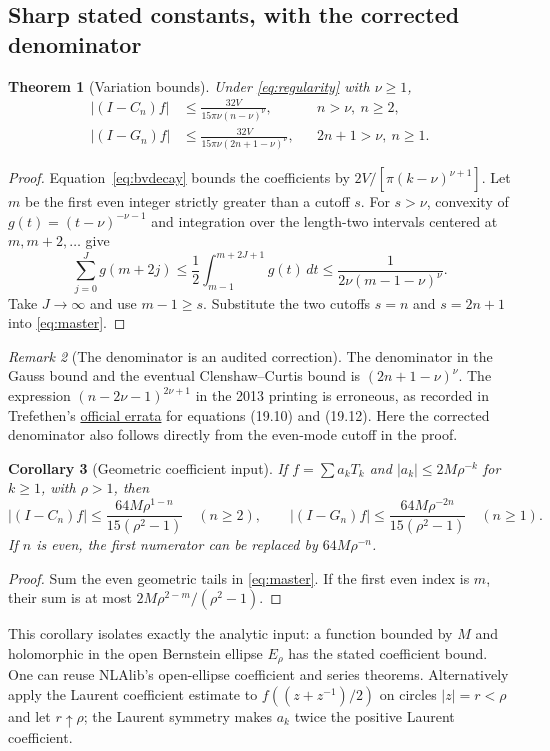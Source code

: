 \documentclass[11pt]{article}
\newtheorem{theorem}{Theorem}[section]
\newtheorem{corollary}[theorem]{Corollary}
\theoremstyle{remark}\newtheorem{remark}[theorem]{Remark}
\begin{document}
\subsection{Sharp stated constants, with the corrected denominator}
\begin{theorem}[Variation bounds]\label{thm:quad-bv}
Under \eqref{eq:regularity} with $\nu\ge1$,
\begin{align}
 |(I-C_n)f|&\le\frac{32V}{15\pi\nu(n-\nu)^\nu},
                  &&n>\nu,\ n\ge2,\label{eq:cc-bv}\\
 |(I-G_n)f|&\le\frac{32V}{15\pi\nu(2n+1-\nu)^\nu},
                  &&2n+1>\nu,\ n\ge1.\label{eq:g-bv}
\end{align}
\end{theorem}
\begin{proof}
Equation~\eqref{eq:bvdecay} bounds the coefficients by
$2V/[\pi(k-\nu)^{\nu+1}]$. Let $m$ be the first even integer strictly
greater than a cutoff $s$. For $s>\nu$, convexity of
$g(t)=(t-\nu)^{-\nu-1}$ and integration over the length-two intervals
centered at $m,m+2,\ldots$ give
\[
 \sum_{j=0}^J g(m+2j)
 \le\frac12\int_{m-1}^{m+2J+1}g(t)\,dt
 \le\frac1{2\nu(m-1-\nu)^\nu}.
\]
Take $J\to\infty$ and use $m-1\ge s$. Substitute the two cutoffs
$s=n$ and $s=2n+1$ into \eqref{eq:master}.
\end{proof}

\begin{remark}[The denominator is an audited correction]
The denominator in the Gauss bound and the eventual Clenshaw--Curtis
bound is $(2n+1-\nu)^\nu$. The expression
$(n-2\nu-1)^{2\nu+1}$ in the 2013 printing is erroneous, as recorded
in Trefethen's \href{https://people.maths.ox.ac.uk/trefethen/ATAP/}{official
errata} for equations (19.10) and (19.12). Here the corrected denominator
also follows directly from the even-mode cutoff in the proof.
\end{remark}

\begin{corollary}[Geometric coefficient input]
If $f=\sum a_kT_k$ and $|a_k|\le2M\rho^{-k}$ for $k\ge1$, with $\rho>1$,
then
\[
 |(I-C_n)f|\le\frac{64M\rho^{1-n}}{15(\rho^2-1)}\quad(n\ge2),
 \qquad
 |(I-G_n)f|\le\frac{64M\rho^{-2n}}{15(\rho^2-1)}\quad(n\ge1).
\]
If $n$ is even, the first numerator can be replaced by $64M\rho^{-n}$.
\end{corollary}
\begin{proof}
Sum the even geometric tails in \eqref{eq:master}. If the first even
index is $m$, their sum is at most $2M\rho^{2-m}/(\rho^2-1)$.
\end{proof}
This corollary isolates exactly the analytic input: a function bounded
by $M$ and holomorphic in the open Bernstein ellipse $E_\rho$ has the
stated coefficient bound. One can reuse NLAlib's open-ellipse coefficient
and series theorems. Alternatively apply the Laurent coefficient estimate
to $f((z+z^{-1})/2)$ on circles $|z|=r<\rho$ and let $r\uparrow\rho$;
the Laurent symmetry makes $a_k$ twice the positive Laurent coefficient.
\end{document}
